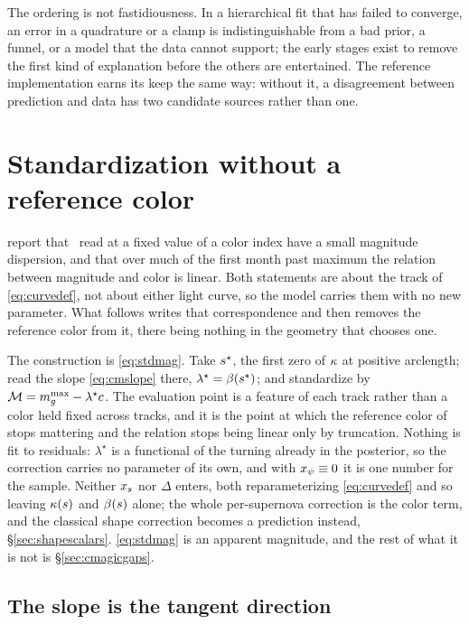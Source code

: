 \documentclass[11pt]{article}
\theoremstyle{plain}
\begin{document}
The ordering is not fastidiousness. In a hierarchical fit that has failed to converge, an
error in a quadrature or a clamp is indistinguishable from a bad prior, a funnel, or a
model that the data cannot support; the early stages exist to remove the first kind of
explanation before the others are entertained. The reference implementation earns its keep
the same way: without it, a disagreement between prediction and data has two candidate
sources rather than one.


\section{Standardization without a reference color}
\label{sec:cmagic}

\citet{Wang2003} report that \sneia\ read at a fixed value of a color index have a small
magnitude dispersion, and that over much of the first month past maximum the relation
between magnitude and color is linear. Both statements are about the track of
\eqref{eq:curvedef}, not about either light curve, so the model carries them with no new
parameter. What follows writes that correspondence and then removes the reference color
from it, there being nothing in the geometry that chooses one.

The construction is \eqref{eq:stdmag}. Take $s^{\star}$, the first zero of $\kappa$ at
positive arclength; read the slope \eqref{eq:cmslope} there,
$\lambda^{\star} = \beta(s^{\star})$; and standardize by
$\mathcal{M} = m_{g}^{\max} - \lambda^{\star}c$. The evaluation point is a feature of each
track rather than a color held fixed across tracks, and it is the point at which the
reference color of \citet{Wang2003} stops mattering and the relation stops being linear
only by truncation. Nothing is fit to residuals: $\lambda^{\star}$ is a functional of the
turning already in the posterior, so the correction carries no parameter of its own, and
with $x_{\psi} \equiv 0$ it is one number for the sample. Neither $x_{s}$ nor
$\Delta$ enters, both reparameterizing \eqref{eq:curvedef} and so leaving $\kappa(s)$
and $\beta(s)$ alone; the whole per-supernova correction is the color term, and the
classical shape correction becomes a prediction instead, \S\ref{sec:shapescalars}.
\eqref{eq:stdmag} is an apparent magnitude, and the rest of what it is not is
\S\ref{sec:cmagicgaps}.

\subsection{The slope is the tangent direction}
\label{sec:cmslope}
\end{document}
